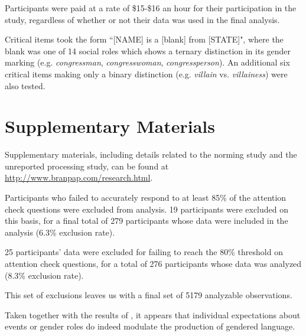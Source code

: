 		Participants were paid at a rate of \$15-\$16 an hour for their participation in the study, regardless of whether or not their data was used in the final analysis.
	

Critical items took the form ``[NAME] is a [blank] from [STATE]", where the blank was one of 14 social roles which shows a ternary distinction in its gender marking (e.g. \textit{congressman}, \textit{congresswoman}, \textit{congressperson}). An additional six critical items making only a binary distinction (e.g. \textit{villain} vs. \textit{villainess}) were also tested. \par 

	\section{Supplementary Materials}
Supplementary materials, including details related to the norming study and the unreported processing study, can be found at \url{http://www.branpap.com/research.html}.

	Participants who failed to accurately respond to at least 85\% of the attention check questions were excluded from analysis. 19 participants were excluded on this basis, for a final total of 279 participants whose data were included in the analysis (6.3\% exclusion rate). \par 
	
25 participants' data were excluded for failing to reach the 80\% threshold on attention check questions, for a total of 276 participants whose data was analyzed (8.3\% exclusion rate).\par

This set of exclusions leaves us with a final set of 5179 analyzable observations.

Taken together with the results of \textcite{pozniak2021failures}, it appears that individual expectations about events or gender roles do indeed modulate the production of gendered language.


